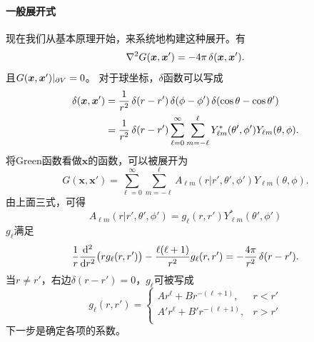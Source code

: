 \paragraph{一般展开式}
现在我们从基本原理开始，来系统地构建这种展开。有%
\[
    \lapla G(\bm x,\bm x')=-4\pi\vd(\bm x,\bm x').
\]
且$G(\bm x,\bm x')|_{\p V}=0$。
对于球坐标，$\delta$函数可以写成
\begin{align*}
    \delta(\bm x,\bm x')&=\frac1{r^2}\vd(r-r')\vd(\phi-\phi')\vd(\cos\theta-\cos\theta')\\
    &=\frac1{r^2}\vd(r-r')\sum_{\ell=0}^\infty\sum_{m=-\ell}^\ell Y_{\ell m}^\ast(\theta',\phi')Y_{\ell m}(\theta,\phi).
\end{align*}
将Green函数看做$\bm x$的函数，可以被展开为
\[
    G(\bm x,\bm x')=\sum_{\ell=0}^\infty\sum_{m=-\ell}^\ell A_{\ell m}(r|r',\theta',\phi')Y_{\ell m}(\theta,\phi).
\]
由上面三式，可得 
\[
    A_{\ell m}(r|r',\theta',\phi')=g_\ell(r,r')Y_{\ell m}^\ast(\theta',\phi')
\]
$g_\ell$满足
\[
    \frac1r\dd[2]r\bigkh{rg_\ell(r,r')}-\frac{\ell(\ell+1)}{r^2}g_\ell(r,r')=-\frac{4\pi}{r^2}\vd(r-r').
\]
当$r\neq r'$，右边$\delta(r-r')=0$，$g_\ell$可被写成
\[
    g_\ell(r,r')=
    \begin{cases}
        Ar^\ell+Br^{-(\ell+1)},&r<r'\\
        A'r^\ell+B'r^{-(\ell+1)},&r>r'\\
    \end{cases}
\]
下一步是确定各项的系数。
